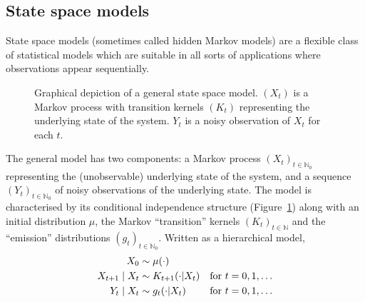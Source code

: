 \subsection{State space models \seb{$\checkmark$} }
\label{sec:SSMs}
State space models (sometimes called hidden Markov models) are a flexible class of statistical models which are suitable in all sorts of applications where observations appear sequentially.
\begin{figure}[ht]
\centering
{}
\caption[Graphical depiction of a general state space model]{Graphical depiction of a general state space model. $(X_t)$ is a Markov process with transition kernels $(K_t)$ representing the underlying state of the system. $Y_t$ is a noisy observation of $X_t$ for each $t$.}
\label{fig:SSM}
\end{figure}
The general model has two components: a Markov process $(X_t)_{t\in\mathbb{N}_0}$ representing the (unobservable) underlying state of the system, and a sequence $(Y_t)_{t\in\mathbb{N}_0}$ of noisy observations of the underlying state. The model is characterised by its conditional independence structure (Figure~\ref{fig:SSM}) along with an initial distribution $\mu$, the Markov ``transition'' kernels $(K_t)_{t\in\mathbb{N}}$ and the ``emission'' distributions $(g_t)_{t\in\mathbb{N}_0}$. 
Written as a hierarchical model,
\begin{align}
X_0 &\sim \mu(\cdot) & \notag\\
X_{t+1} \mid X_t &\sim K_{t+1}(\cdot | X_t) & \text{for } t=0, 1, \dots
        \label{eq:SSM_spec}\\
Y_t \mid X_t &\sim g_t(\cdot | X_t) & \text{for } t=0, 1, \dots \notag\\
\end{align}

